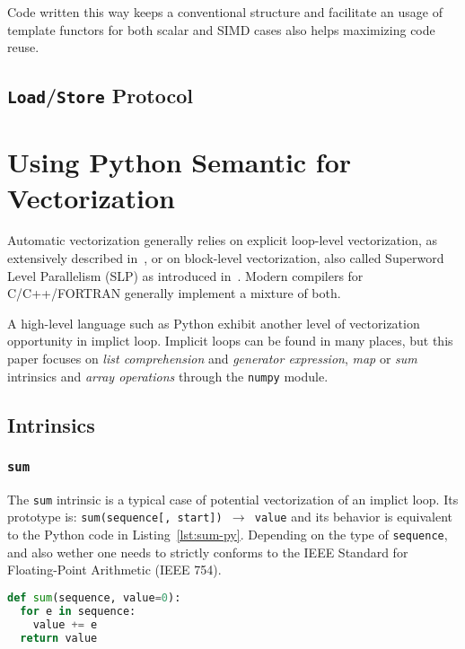 \documentclass[preprint]{sigplanconf}
\begin{document}
Code written this way keeps a conventional structure and facilitate an usage of template
functors for both scalar and SIMD cases also helps maximizing code reuse.

\subsection{\texttt{Load}/\texttt{Store} Protocol}


\section{Using Python Semantic for Vectorization}
\label{sec:python-semantic}

Automatic vectorization generally relies on explicit loop-level vectorization, as
extensively described in~\cite{bik04}, or on block-level vectorization, also
called Superword Level Parallelism (SLP) as introduced in~\cite{larsen00}.
Modern compilers for C/C++/FORTRAN generally implement a mixture of both.

A high-level language such as Python exhibit another level of vectorization
opportunity in implict loop. Implicit loops can be found in many places, but
this paper focuses on \emph{list comprehension} and \emph{generator
expression}, \emph{map} or \emph{sum} intrinsics and \emph{array operations}
through the \texttt{numpy} module.

\subsection{Intrinsics}

\subsubsection{\texttt{sum}}

The \texttt{sum} intrinsic is a typical case of potential vectorization of an
implict loop. Its prototype is: \texttt{sum(sequence[, start]) $\rightarrow$
value} and its behavior is equivalent to the Python code in
Listing~\ref{lst:sum-py}. Depending on the type of \texttt{sequence}, and also
wether one needs to strictly conforms to the IEEE Standard for Floating-Point
Arithmetic (IEEE 754).

\begin{lstlisting}[language=python, label={lst:sum-py}, caption={Pseudo code of the \texttt{sum} intrinsic.}]
def sum(sequence, value=0):
  for e in sequence:
    value += e
  return value
\end{lstlisting}
\end{document}
